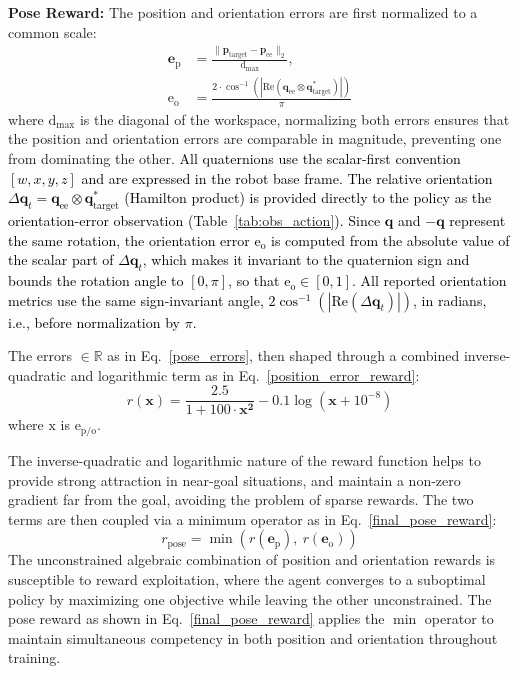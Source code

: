 \documentclass[preprint,12pt]{elsarticle}
\begin{document}
\noindent \textbf{Pose Reward:}
The position and orientation errors are first normalized to a common scale:
\begin{equation}
    \begin{split}
    {\mathbf{\text{e}}}_{\text{p}} &= \frac{\|\mathbf{\text{p}}_\text{target} - \mathbf{\text{p}}_\text{ee}\|_{2}}{\text{d}_\text{max}}, \\ {\text{e}}_{\text{o}} &= \frac{2\cdot \cos^{-1}(|\text{Re}(\mathbf{\text{q}}_\text{ee} \otimes \mathbf{\text{q}}_\text{target}^{*})|)}{\pi}
    \end{split}
    \label{pose_errors}
\end{equation}
where $\text{d}_{\text{max}}$ is the diagonal of the workspace, normalizing both errors ensures that the position and orientation errors are comparable in magnitude, preventing one from dominating the other. \textcolor{black}{All quaternions use the scalar-first convention $[w, x, y, z]$ and are expressed in the robot base frame. The relative orientation $\Delta\mathbf{q}_t = \mathbf{q}_\text{ee} \otimes \mathbf{q}_\text{target}^{*}$ (Hamilton product) is provided directly to the policy as the orientation-error observation (Table~\ref{tab:obs_action}). Since $\mathbf{q}$ and $-\mathbf{q}$ represent the same rotation, the orientation error $\text{e}_\text{o}$ is computed from the absolute value of the scalar part of $\Delta\mathbf{q}_t$, which makes it invariant to the quaternion sign and bounds the rotation angle to $[0, \pi]$, so that $\text{e}_\text{o} \in [0, 1]$. All reported orientation metrics use the same sign-invariant angle, $2\cos^{-1}(|\text{Re}(\Delta\mathbf{q}_t)|)$, in radians, i.e., before normalization by $\pi$.}

The errors $\in\mathbb{R}$ as in Eq.~\eqref{pose_errors}, then shaped through a combined inverse-quadratic and logarithmic term as in Eq.~\eqref{position_error_reward}:
\begin{equation}
    r({\mathbf{\text{x}}}) = \frac{2.5}{1 + 100 \cdot \mathbf{\text{x}^{\text{2}}}}  - 0.1\log(\mathbf{\text{x}} + 10^{-8})
    \label{position_error_reward}
\end{equation}
where $\text{x}$ is $\text{e}_\text{p/o}$.

\noindent The inverse-quadratic and logarithmic nature of the reward function helps to provide strong attraction in near-goal situations, and maintain a non-zero gradient far from the goal, avoiding the problem of sparse rewards.
The two terms are then coupled via a minimum operator as in Eq.~\eqref{final_pose_reward}:
\begin{equation}
    r_\text{pose} = \min(r({\mathbf{\text{e}}}_\text{p}),\ r({\mathbf{\text{e}}}_\text{o}))
    \label{final_pose_reward}
\end{equation}
The unconstrained algebraic combination of position and orientation rewards is susceptible to reward exploitation, where the agent converges to a suboptimal policy by maximizing one objective while leaving the other unconstrained. The pose reward as shown in Eq.~\eqref{final_pose_reward} applies the $\min$ operator to maintain simultaneous competency in both position and orientation throughout training. 
\end{document}
